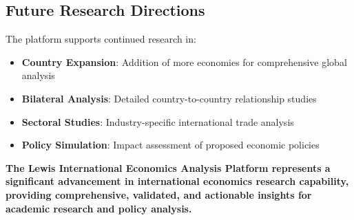 \documentclass[11pt,a4paper]{article}
\begin{document}
\subsection{Future Research Directions}
The platform supports continued research in:

\begin{itemize}
    \item \textbf{Country Expansion}: Addition of more economies for comprehensive global analysis
    \item \textbf{Bilateral Analysis}: Detailed country-to-country relationship studies
    \item \textbf{Sectoral Studies}: Industry-specific international trade analysis
    \item \textbf{Policy Simulation}: Impact assessment of proposed economic policies
\end{itemize}

\begin{center}
\textbf{\large The Lewis International Economics Analysis Platform represents a significant advancement in international economics research capability, providing comprehensive, validated, and actionable insights for academic research and policy analysis.}
\end{center}
\end{document}
